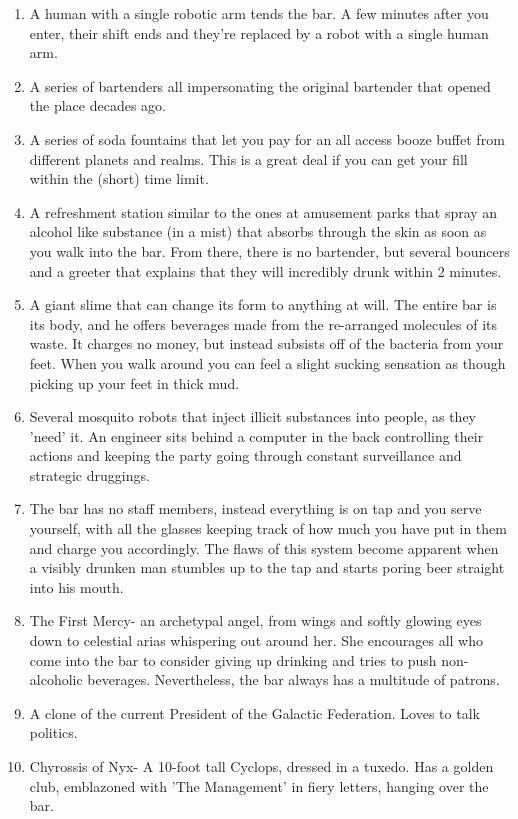 \documentclass{article}
\begin{document}
\begin{enumerate}
	\item A human with a single robotic arm tends the bar. A few minutes after you enter, their shift ends and they're replaced by a robot with a single human arm.
	\item A series of bartenders all impersonating the original bartender that opened the place decades ago.
	\item A series of soda fountains that let you pay for an all access booze buffet from different planets and realms. This is a great deal if you can get your fill within the (short) time limit.
	\item A refreshment station similar to the ones at amusement parks that spray an alcohol like substance (in a mist) that absorbs through the skin as soon as you walk into the bar. From there, there is no bartender, but several bouncers and a greeter that explains that they will incredibly drunk within 2 minutes.
	\item A giant slime that can change its form to anything at will. The entire bar is its body, and he offers beverages made from the re-arranged molecules of its waste. It charges no money, but instead subsists off of the bacteria from your feet. When you walk around you can feel a slight sucking sensation as though picking up your feet in thick mud.
	\item Several mosquito robots that inject illicit substances into people, as they 'need' it. An engineer sits behind a computer in the back controlling their actions and keeping the party going through constant surveillance and strategic druggings.
	\item The bar has no staff members, instead everything is on tap and you serve yourself, with all the glasses keeping track of how much you have put in them and charge you accordingly. The flaws of this system become apparent when a visibly drunken man stumbles up to the tap and starts poring beer straight into his mouth.
	\item The First Mercy- an archetypal angel, from wings and softly glowing eyes down to celestial arias whispering out around her. She encourages all who come into the bar to consider giving up drinking and tries to push non-alcoholic beverages. Nevertheless, the bar always has a multitude of patrons.
	\item A clone of the current President of the Galactic Federation. Loves to talk politics.
	\item Chyrossis of Nyx- A 10-foot tall Cyclops, dressed in a tuxedo. Has a golden club, emblazoned with 'The Management' in fiery letters, hanging over the bar.

\end{enumerate}
\end{document}
